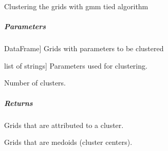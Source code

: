 \documentclass[letterpaper,10pt,english]{sphinxmanual}
\begin{document}
\begin{fulllineitems}
\label{\detokenize{classification/classification_steps/clustering:classification.clustering.clustering_algorithms.gmm_tied_clustering}}
\pysigstartsignatures
{}
\pysigstopsignatures
\sphinxAtStartPar
Clustering the grids with gmm tied algorithm


\subparagraph{Parameters}
\label{\detokenize{classification/classification_steps/clustering:id1}}\begin{description}
\sphinxlineitem{df\_parameters\_of\_grids}{[}DataFrame{]}
\sphinxAtStartPar
Grids with parameters to be clustered

\sphinxlineitem{list\_of\_clustering\_parameters}{[}list of strings{]}
\sphinxAtStartPar
Parameters used for clustering.

\sphinxAtStartPar
Number of clusters.

\end{description}


\subparagraph{Returns}
\label{\detokenize{classification/classification_steps/clustering:id2}}\begin{description}
\sphinxAtStartPar
Grids that are attributed to a cluster.

\sphinxAtStartPar
Grids that are medoids (cluster centers).

\end{description}

\end{fulllineitems}

\end{document}
